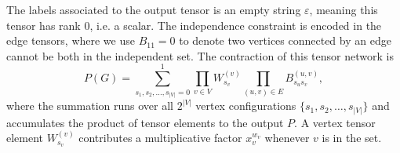 \documentclass[review, onefignum, onetabnum]{siamart190516}
\begin{document}
The labels associated to the output tensor is an empty string $\varepsilon$, meaning this tensor has rank $0$, i.e. a scalar.
The independence constraint is encoded in the edge tensors, where we use $B_{11} = 0$ to denote two vertices connected by an edge cannot be both in the independent set. 
The contraction of this tensor network is
\begin{equation}\label{eq:idp}
    P(G) = \sum\limits_{s_1, s_2, \ldots, s_{|V|} = 0}^{1} \prod\limits_{v\in V} W^{(v)}_{s_v} \prod\limits_{(u,v) \in E} B^{(u,v)}_{s_u s_v},
\end{equation}
where the summation runs over all $2^{|V|}$ vertex configurations $\{s_1, s_{2}, \ldots,s_{|V|}\}$ and accumulates the product of tensor elements to the output $P$. 
A vertex tensor element $W^{(v)}_{s_v}$ contributes a multiplicative factor $x_v^{w_v}$ whenever $v$ is in the set.
\end{document}
